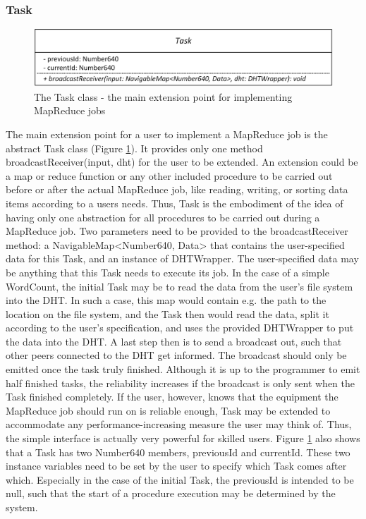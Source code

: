 \subsubsection{Task}
\begin{figure}
	\centering	
	\includegraphics{imgs/taskclass}
	\caption{The Task class - the main extension point for implementing MapReduce jobs}	
	\label{fig:taskclass}
\end{figure}  
The main extension point for a user to implement a MapReduce job is the abstract Task class (Figure \ref{fig:taskclass}). It provides only one method broadcastReceiver(input, dht) for the user to be extended. An extension could be a map or reduce function or any other included procedure to be carried out before or after the actual MapReduce job, like reading, writing, or sorting data items according to a users needs. Thus, Task is the embodiment of the idea of having only one abstraction for all procedures to be carried out during a MapReduce job. Two parameters need to be provided to the broadcastReceiver method: a NavigableMap<Number640, Data> that contains the user-specified data for this Task, and an instance of DHTWrapper. The user-specified data may be anything that this Task needs to execute its job. In the case of a simple WordCount, the initial Task may be to read the data from the user's file system into the DHT. In such a case, this map would contain e.g. the path to the location on the file system, and the Task then would read the data, split it according to the user's specification, and uses the provided DHTWrapper to put the data into the DHT. A last step then is to send a broadcast out, such that other peers connected to the DHT get informed. The broadcast should only be emitted once the task truly finished. Although it is up to the programmer to emit half finished tasks, the reliability increases if the broadcast is only sent when the Task finished completely. If the user, however, knows that the equipment the MapReduce job should run on is reliable enough, Task may be extended to accommodate any performance-increasing measure the user may think of. Thus, the simple interface is actually very powerful for skilled users. Figure \ref{fig:taskclass} also shows that a Task has two Number640 members, previousId and currentId. These two instance variables need to be set by the user to specify which Task comes after which. Especially in the case of the initial Task, the previousId is intended to be null, such that the start of a procedure execution may be determined by the system.

